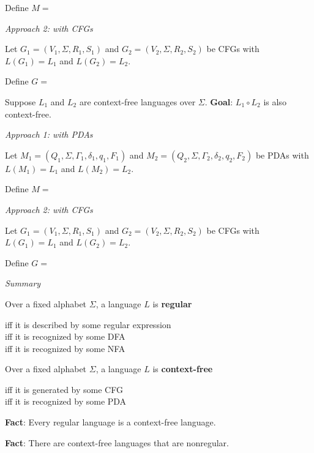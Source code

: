 \documentclass[12pt, oneside]{article}
\begin{document}
Define $M = $

\vfill

{\it Approach  2: with CFGs}

Let $G_1 = (V_1, \Sigma, R_1, S_1)$  and   $G_2 = (V_2, \Sigma, R_2, S_2)$  be CFGs  with
$L(G_1) =  L_1$  and  $L(G_2) = L_2$.

Define $G = $

\vfill

\newpage
Suppose $L_1$ and $L_2$ are context-free languages over $\Sigma$.  {\bf Goal}:  $L_1 \circ L_2$  is  also context-free.


{\it Approach 1: with  PDAs}

Let $M_1 = ( Q_1, \Sigma, \Gamma_1, \delta_1, q_1, F_1)$ and
$M_2 = ( Q_2, \Sigma, \Gamma_2, \delta_2, q_2, F_2)$ be PDAs with 
$L(M_1) =  L_1$  and  $L(M_2) = L_2$.

Define $M = $

\vfill

{\it Approach  2: with CFGs}

Let $G_1 = (V_1, \Sigma, R_1, S_1)$  and   $G_2 = (V_2, \Sigma, R_2, S_2)$  be CFGs  with
$L(G_1) =  L_1$  and  $L(G_2) = L_2$.

Define $G = $

\vfill
\newpage

{\it Summary}

Over a fixed alphabet $\Sigma$, a language $L$ is {\bf regular}

\vspace{-20pt}
\begin{center}
    iff it is described by some regular expression \\
    iff it is recognized by some DFA\\
    iff it is recognized by some NFA
\end{center}

Over a fixed alphabet $\Sigma$, a language $L$ is {\bf context-free}

\vspace{-20pt}
\begin{center}
    iff it is generated by some CFG\\
    iff it is recognized by some PDA
\end{center}

\vfill

{\bf Fact}: Every regular language is a context-free language.

\vfill

{\bf Fact}: There are context-free languages that are nonregular.
\end{document}
